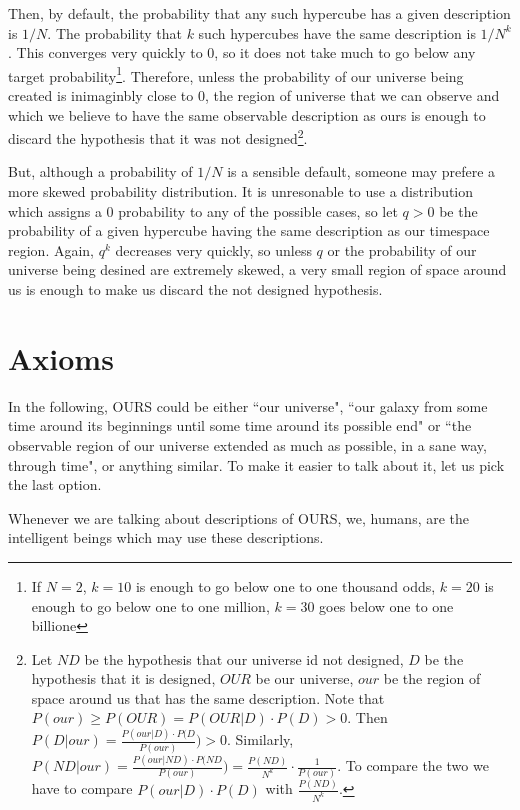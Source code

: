 \documentclass[a4paper
,draft
]{article}
\newcommand{\ghilimele}[1]{``#1"}
\begin{document}
Then, by default, the probability that any such hypercube has a given description is $1/N$. The probability that $k$ such hypercubes have the same description is $1/N^k$. This converges very quickly to $0$, so it does not take much to go below any target probability\footnote{If $N=2$, $k=10$ is enough to go below one to one thousand odds, $k=20$ is enough to go below one to one million, $k=30$ goes below one to one billione}. Therefore, unless the probability of our universe being created is inimaginbly close to $0$, the region of universe that we can observe and which we believe to have the same observable description as ours is enough to discard the hypothesis that it was not designed\footnote{Let $ND$ be the hypothesis that our universe id not designed, $D$ be the hypothesis that it is designed, $OUR$ be our universe, $our$ be the region of space around us that has the same description. Note that $P(our) \ge P(OUR)=P(OUR|D)\cdot P(D) > 0$. Then $P(D|our) = \frac{P(our|D)\cdot P(D}{P(our)}) > 0$. Similarly, $P(ND|our) = \frac{P(our|ND)\cdot P(ND}{P(our)}) = \frac{P(ND)}{N^k} \cdot \frac{1}{P(our)}$. To compare the two we have to compare $P(our|D)\cdot P(D)$ with $\frac{P(ND)}{N^k}$.}. 

But, although a probability of $1/N$ is a sensible default, someone may prefere a more skewed probability distribution. It is unresonable to use a distribution which assigns a $0$ probability to any of the possible cases, so let $q > 0$ be the probability of a given hypercube having the same description as our timespace region. Again, $q^k$ decreases very quickly, so unless $q$ or the probability of our universe being desined are extremely skewed, a very small region of space around us is enough to make us discard the not designed hypothesis.

\section{Axioms}

In the following, OURS could be either \ghilimele{our universe}, \ghilimele{our galaxy from some time around its beginnings until some time around its possible end} or \ghilimele{the observable region of our universe extended as much as possible, in a sane way, through time}, or anything similar. To make it easier to talk about it, let us pick the last option.

Whenever we are talking about descriptions of OURS, we, humans, are the intelligent beings which may use these descriptions.
\end{document}
